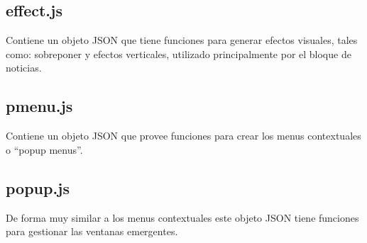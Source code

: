 

\subsection{effect.js}
Contiene un objeto JSON que tiene funciones para generar efectos visuales, tales como: sobreponer y efectos verticales, utilizado principalmente por el bloque de noticias.



\subsection{pmenu.js}
Contiene un objeto JSON que provee funciones para crear los menus contextuales o ``popup menus''.



\subsection{popup.js}
De forma muy similar a los menus contextuales este objeto JSON tiene funciones para gestionar las ventanas emergentes.



\clearpage
